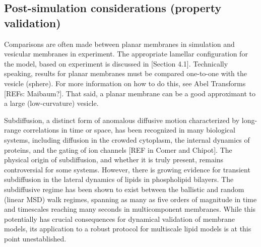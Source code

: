 \documentclass[9pt,bestpractices]{livecoms}
\begin{document}
\subsection{Post-simulation considerations (property validation)}
Comparisons are often made between planar membranes in simulation and vesicular membranes in experiment.
The appropriate lamellar configuration for the model, based on experiment is discussed in [Section 4.1].
Technically speaking, results for planar membranes must be compared one-to-one with the vesicle (sphere).
For more information on how to do this, see Abel Transforms [REFs: Maibaum?].
That said, a planar membrane can be a good approximant to a large (low-curvature) vesicle.

Subdiffusion, a distinct form of anomalous diffusive motion characterized by long-range correlations in time or space, has been recognized in many biological systems, including diffusion in the crowded cytoplasm, the internal dynamics of proteins, and the gating of ion channels [REF in Comer and Chipot].
The physical origin of subdiffusion, and whether it is truly present, remains controversial for some systems.
However, there is growing evidence for transient subdiffusion in the lateral dynamics of lipids in phospholipid bilayers.
The subdiffusive regime has been shown to exist between the ballistic and random (linear MSD) walk regimes, spanning as many as five orders of magnitude in time and timescales reaching many seconds in multicomponent membranes.
While this potentially has crucial consequences for dynamical validation of membrane models, its application to a robust protocol for multiscale lipid models is at this point unestablished.

\end{document}
